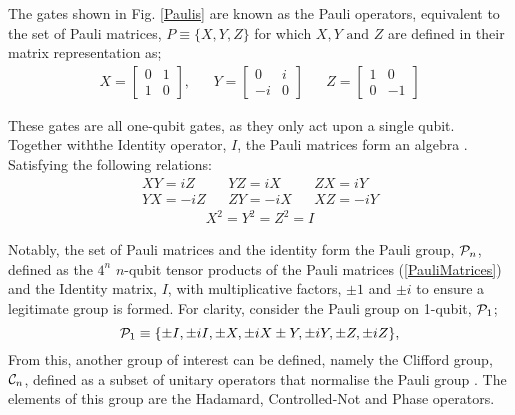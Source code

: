 The gates shown in Fig. \ref{Paulis} are known as the Pauli operators, equivalent
to the set of Pauli matrices, $P \equiv \{X, Y, Z\}$ for which $X, Y \text{ and } Z$ are defined in their matrix representation as;
\begin{align}
    \label{PauliMatrices}
    X = \begin{bmatrix}
            0 & 1 \\
            1 & 0
        \end{bmatrix},
     &  &
    Y = \begin{bmatrix}
            0  & i \\
            -i & 0
        \end{bmatrix}
     &  &
    Z = \begin{bmatrix}
            1 & 0  \\
            0 & -1
        \end{bmatrix}
\end{align}

These gates are all one-qubit gates, as they only act upon a single qubit. 
Together withthe Identity operator, $I$, the Pauli matrices form an algebra .
Satisfying the following relations:
\begin{align}
    XY = iZ  &  & YZ = iX  &  & ZX = iY  \\
    YX = -iZ &  & ZY = -iX &  & XZ = -iY
\end{align}
\begin{align}
    X^2 = Y^2 = Z^2 = I
\end{align}

Notably, the set of Pauli matrices and the identity form
the Pauli group, ${\cal P}_n$, defined as the $4^n$ $n$-qubit tensor products of the Pauli matrices (\ref{PauliMatrices}) and the
Identity matrix, $I$, with multiplicative factors, $\pm 1$ and $\pm i$ to ensure a legitimate group is formed.
For clarity, consider the Pauli group on 1-qubit, ${\cal P}_1$;
\begin{equation}
    {\cal P}_1 \equiv \{ \pm I, \pm iI, \pm X, \pm iX \pm Y, \pm iY, \pm Z, \pm iZ\},
\end{equation}
From this, another group of interest can be defined, namely the Clifford group, ${\cal C}_n$, defined as a
subset of unitary operators that normalise the Pauli group \cite{orthogonalcodes}. The elements of this group are the
Hadamard, Controlled-Not and Phase operators.

